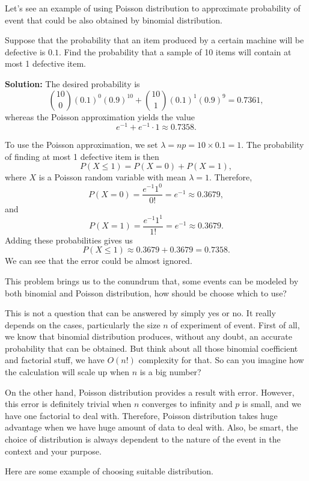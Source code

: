 Let's see an example of using Poisson distribution to approximate probability of event that could be also obtained by binomial distribution. 
\begin{example}
    Suppose that the probability that an item produced by a certain machine will be defective is \(0.1\). Find the probability that a sample of 10 items will contain at most 1 defective item.
    
    \textbf{Solution:} The desired probability is 
    \[
    \binom{10}{0} (0.1)^0 (0.9)^{10} + \binom{10}{1} (0.1)^1 (0.9)^9 = 0.7361,
    \]
    whereas the Poisson approximation yields the value 
    \[
    e^{-1} + e^{-1} \cdot 1 \approx 0.7358.
    \]
    
    To use the Poisson approximation, we set \(\lambda = np = 10 \times 0.1 = 1\). The probability of finding at most 1 defective item is then
    \[
    P(X \leq 1) = P(X = 0) + P(X = 1),
    \]
    where \(X\) is a Poisson random variable with mean \(\lambda = 1\). Therefore,
    \[
    P(X = 0) = \frac{e^{-1} 1^0}{0!} = e^{-1} \approx 0.3679,
    \]
    and
    \[
    P(X = 1) = \frac{e^{-1} 1^1}{1!} = e^{-1} \approx 0.3679.
    \]
    Adding these probabilities gives us
    \[
    P(X \leq 1) \approx 0.3679 + 0.3679 = 0.7358.
    \]
    We can see that the error could be almost ignored.
\end{example}

This problem brings us to the conundrum that, some events can be modeled by both binomial and Poisson distribution, how should be choose which to use? 

This is not a question that can be answered by simply yes or no. It really depends on the cases, particularly the size $n$ of experiment of event. First of all, we know that binomial distribution produces, without any doubt, an accurate probability that can be obtained. But think about all those binomial coefficient and factorial stuff, we have $O(n!)$ complexity for that. So can you imagine how the calculation will scale up when $n$ is a big number?

On the other hand, Poisson distribution provides a result with error. However, this error is definitely trivial when $n$ converges to infinity and $p$ is small, and we have one factorial to deal with. Therefore, Poisson distribution takes huge advantage when we have huge amount of data to deal with. Also, be smart, the choice of distribution is always dependent to the nature of the event in the context and your purpose.  

Here are some example of choosing suitable distribution.

